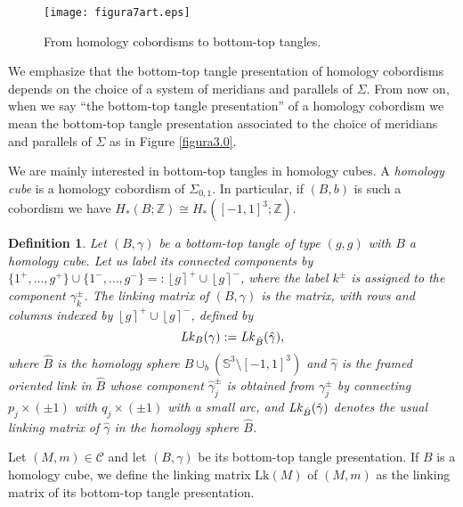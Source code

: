 \documentclass[10pt]{amsart}
\numberwithin{equation}{section}
\numberwithin{equation}{section}
\newtheorem{definition}[theorem]{Definition}
\theoremstyle{definition}
\begin{document}
\begin{figure}[ht!] 
										\centering
                        \texttt{[image: figura7art.eps]}
												\caption{From homology cobordisms to bottom-top tangles.}
												\label{figura4.7}
\end{figure}

We emphasize that the bottom-top tangle presentation of homology cobordisms depends on the choice of a system of meridians and parallels  of $\Sigma$. From now on, when we say ``the bottom-top tangle presentation'' of a homology cobordism we mean the bottom-top tangle presentation associated to the choice of meridians and parallels of $\Sigma$ as  in  Figure \ref{figura3.0}.


We are mainly interested in bottom-top tangles in homology cubes. A \emph{homology cube} is a homology cobordism of  $\Sigma_{0,1}$. In particular, if $(B,b)$ is such a cobordism we have $H_*(B;\mathbb{Z})\cong H_*([-1,1]^3;\mathbb{Z})$.

\begin{definition}\label{linkingbt}
Let $(B,\gamma)$ be a bottom-top tangle of type $(g,g)$ with $B$ a homology cube. Let us label its connected components by $\{1^+,\ldots,g^+\}\cup\{1^-,\ldots,g^-\}=:\left\lfloor g \right\rceil^+ \cup\left\lfloor  g\right\rceil^-$, where the label $k^{\pm}$ is assigned to the component $\gamma_k^{\pm}$. The \emph{linking matrix} of $(B,\gamma)$ is the matrix, with rows and columns indexed by  $\left\lfloor g \right\rceil^+ \cup\left\lfloor  g\right\rceil^-$, defined by
\begin{equation}\label{defilinkingbt}
\text{\emph{Lk}}_B(\gamma):= \text{\emph{Lk}}_{\hat{B}}(\hat{\gamma}),
\end{equation}
where $\hat{B}$ is the homology sphere $B\cup_b(\mathbb{S}^3\setminus \left[-1,1\right]^3)$ and $\hat{\gamma}$ is the framed oriented link in $\hat{B}$ whose component $\hat{\gamma}_j^{\pm}$ is obtained from $\gamma_j^{\pm}$ by connecting $p_j\times(\pm 1)$ with $q_j\times(\pm 1)$ with a small arc, and $\text{\emph{Lk}}_{\hat{B}}(\hat{\gamma})$ denotes the usual linking matrix of $\hat{\gamma}$ in the homology sphere  $\hat{B}$.
\end{definition}


Let $(M,m)\in\mathcal{C}$ and let $(B,\gamma)$ be its bottom-top tangle presentation. If $B$ is a homology cube, we  define the linking matrix $\text{Lk}(M)$ of $(M,m)$ as the linking matrix of its bottom-top tangle presentation. 
\end{document}
